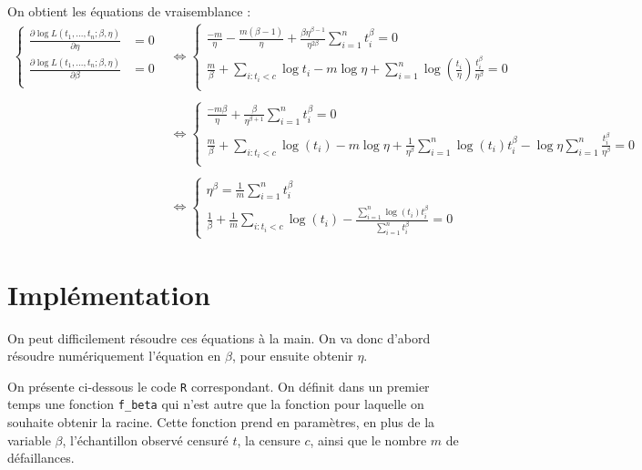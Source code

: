 \documentclass[a4paper]{report}
\begin{document}
     On obtient les équations de vraisemblance :
     \begin{align}
     	\begin{cases}
		\frac{\partial \log L(t_1,...,t_n;\beta,\eta)}{\partial \eta} & = 0 \nonumber\\
	 	\frac{\partial \log L(t_1,...,t_n;\beta,\eta)}{\partial \beta} & = 0 \nonumber\\
     	\end{cases}
     	&\iff 
      	\begin{cases}
		\frac{-m}{\eta} - \frac{m(\beta -1)}{\eta} + \frac{\beta \eta^{\beta-1}}		{\eta^{2\beta}} \sum_{i=1}^{n} {t_i^\beta} = 0  \nonumber\\
	 	\frac{m}{\beta} + \sum_{i:t_i<c}{\log t_i} - m \log \eta + \sum_{i=1}^{n} {\log (\frac{t_i}{\eta}) \frac{t_i^\beta}{\eta^\beta}} = 0  \nonumber\\
     	\end{cases}
   	\\
   	 \nonumber\\
   	&\iff
   	\begin{cases}
     		\frac{-m\beta}{\eta} + \frac{\beta}{\eta^{\beta+1}} \sum_{i=1}^{n} {t_i^\beta} = 0 \nonumber\\
		\frac{m}{\beta} +  \sum_{i:t_i<c}{\log (t_i)} - m\log \eta + \frac{1}{\eta^{\beta}} \sum_{i=1}^{n} {\log (t_i)} t_i^{\beta} - \log \eta \sum_{i=1}^{n} \frac{t_i^\beta}{\eta^\beta}  = 0 \nonumber\\
     	\end{cases}
     	\\
     	 \nonumber\\
     	&\iff
   	\begin{cases}
     		\eta^{\beta} = \frac{1}{m}  \sum_{i=1}^{n} {t_i^\beta} \label{eqEMV}\\
		\frac{1}{\beta} + \frac{1}{m} \sum_{i:t_i<c}{\log (t_i)} - \frac{\sum_{i=1}^{n}  {\log (t_i)} t_i^{\beta}}{\sum_{i=1}^{n} {t_i^{\beta}}}  = 0 
     	\end{cases}
\end{align}

\section{Implémentation}

On peut difficilement résoudre ces équations à la main. On va donc d'abord résoudre numériquement l'équation en $\beta$, pour ensuite obtenir $\eta$.

On présente ci-dessous le code \verb|R| correspondant. On définit dans un premier temps une fonction \verb|f_beta| qui n'est autre que la fonction pour laquelle on souhaite obtenir la racine. Cette fonction prend en paramètres, en plus de la variable $\beta$, l'échantillon observé censuré $t$, la censure $c$, ainsi que le nombre $m$ de défaillances.
\end{document}
